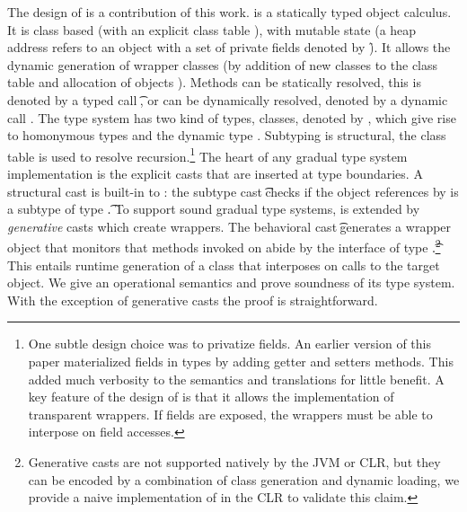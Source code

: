 \documentclass[acmlarge, anonymous, authordraft, review]{acmart} %
\begin{document}
The design of \kafka is a contribution of this work.  \kafka is a statically
typed object calculus.  It is class based (with an explicit class table \K),
with mutable state (a heap address \a refers to an object with a set of
private fields denoted by \f). It allows the dynamic generation of wrapper
classes (by addition of new classes to the class table \K and allocation of
objects \a).  Methods can be statically resolved, this is denoted by a typed
call \KCall\a\m\x\t\tp, or can be dynamically resolved, denoted by a dynamic
call \DynCall\a\m\x. The \kafka type system has two kind of types, classes,
denoted by \C, which give rise to homonymous types and the dynamic type
\any. Subtyping is structural, the class table \K is used to resolve
recursion.\footnote{One subtle design choice was to privatize fields.  An
  earlier version of this paper materialized fields in types by adding
  getter and setters methods. This added much verbosity to the semantics and
  translations for little benefit. A key feature of the design of \kafka is
  that it allows the implementation of transparent wrappers. If fields are
  exposed, the wrappers must be able to interpose on field accesses.} The
heart of any gradual type system implementation is the explicit casts that
are inserted at type boundaries.  A structural cast is built-in to \kafka:
the subtype cast \SubCast\t\a checks if the object references by \a is a
subtype of type \t.  To support sound gradual type systems, \kafka is
extended by \emph{generative} casts which create wrappers.  The behavioral
cast \BehCast\t\a generates a wrapper object that monitors that methods
invoked on \a abide by the interface of type \t.\footnote{Generative casts
  are not supported natively by the JVM or CLR, but they can be encoded by a
  combination of class generation and dynamic loading, we provide a naive
  implementation of \kafka in the CLR to validate this claim.} This entails
runtime generation of a class that interposes on calls to the target
object. We give \kafka an operational semantics and prove soundness of its
type system. With the exception of generative casts the proof is
straightforward.
\end{document}
